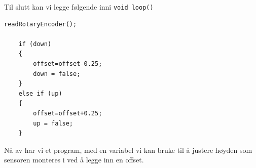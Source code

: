 Til slutt kan vi legge følgende inni  \verb|void loop()|

\begin{lstlisting}[language=Arduino]
	readRotaryEncoder();

	if (down) 
	{
		offset=offset-0.25;
		down = false;
	}
	else if (up) 
	{
		offset=offset+0.25;
		up = false;
	}
\end{lstlisting}

Nå av har vi et  program, med en variabel vi kan bruke til å justere høyden som  sensoren monteres i ved å legge inn en offset. 





\vskip 5pt 



